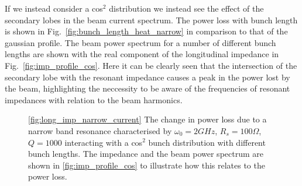 If we instead consider a cos$^{2}$ distribution we instead see the effect of the secondary lobes in the beam current spectrum. The power loss with bunch length is shown in Fig.~\ref{fig:bunch_length_heat_narrow} in comparison to that of the gaussian profile. The beam power spectrum for a number of different bunch lengths are shown with the real component of the longitudinal impedance in Fig.~\ref{fig:imp_profile_cos}. Here it can be clearly seen that the intersection of the secondary lobe with the resonant impedance causes a peak in the power lost by the beam, highlighting the neccessity to be aware of the frequencies of resonant impedances with relation to the beam harmonics.


\begin{figure}
\caption{\ref{fig:long_imp_narrow_current} The change in power loss due to a narrow band resonance characterised by $\omega_{0} = 2GHz$, $R_{s} = 100\Omega$, $Q = 1000$ interacting with a cos$^{2}$ bunch distribution with different bunch lengths. The impedance and the beam power spectrum are shown in \ref{fig:imp_profile_cos} to illustrate how this relates to the power loss.}
\end{figure}

